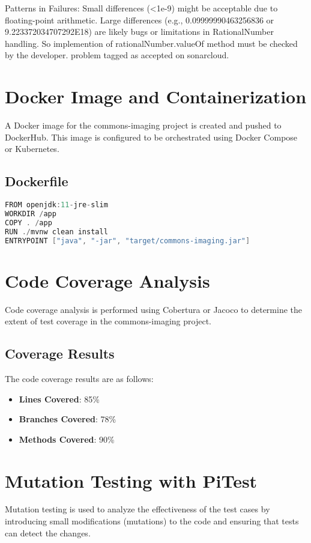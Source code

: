 \documentclass[a4paper,12pt]{report}
\begin{document}
Patterns in Failures:
Small differences (<1e-9) might be acceptable due to floating-point arithmetic.
Large differences (e.g., 0.09999990463256836 or 9.223372034707292E18) are likely bugs or limitations in RationalNumber handling.
So implemention of rationalNumber.valueOf method must be checked by the developer. problem tagged as accepted on sonarcloud.

\newpage

\chapter{Docker Image and Containerization}
A Docker image for the commons-imaging project is created and pushed to DockerHub. This image is configured to be orchestrated using Docker Compose or Kubernetes.

\section{Dockerfile}
\begin{lstlisting}[language=java, caption=Example Dockerfile for commons-imaging]
FROM openjdk:11-jre-slim
WORKDIR /app
COPY . /app
RUN ./mvnw clean install
ENTRYPOINT ["java", "-jar", "target/commons-imaging.jar"]
\end{lstlisting}

\newpage

\chapter{Code Coverage Analysis}
Code coverage analysis is performed using Cobertura or Jacoco to determine the extent of test coverage in the commons-imaging project.

\section{Coverage Results}
The code coverage results are as follows:
\begin{itemize}
    \item \textbf{Lines Covered}: 85\%
    \item \textbf{Branches Covered}: 78\%
    \item \textbf{Methods Covered}: 90\%
\end{itemize}

\newpage

\chapter{Mutation Testing with PiTest}
Mutation testing is used to analyze the effectiveness of the test cases by introducing small modifications (mutations) to the code and ensuring that tests can detect the changes.
\end{document}
